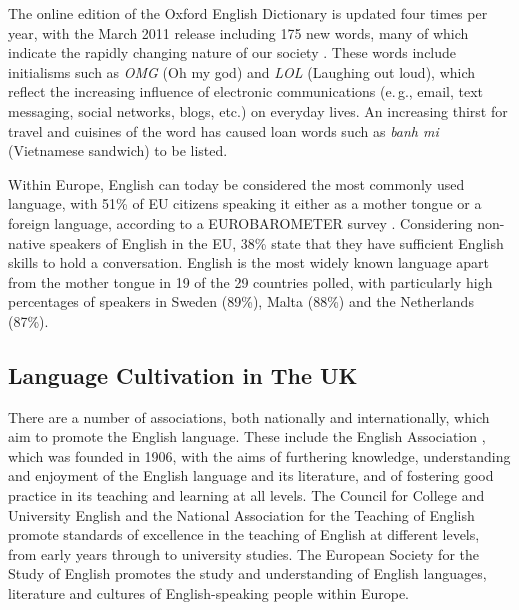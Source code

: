 \begin{multicols}{2}
     
The online edition of the Oxford English Dictionary is updated four times per year, with the March 2011 release including 175 new words, many of which indicate the rapidly changing nature of our society \cite{oed}. These words include initialisms such as \textit{OMG} (Oh my god) and \textit{LOL} (Laughing out loud), which reflect the increasing influence of electronic communications (e.\,g., email, text messaging, social networks, blogs, etc.) on everyday lives. An increasing thirst for travel and cuisines of the word has caused loan words such as \textit{banh mi} (Vietnamese sandwich) to be listed. 
    
             
Within Europe, English can today be considered the most commonly used language, with 51\% of EU citizens speaking it either as a mother tongue or a foreign language, according to a EUROBAROMETER survey \cite{europa}. Considering non-native speakers of English in the EU, 38\% state that they have sufficient English skills to hold a conversation. English is the most widely known language apart from the mother tongue in 19 of the 29 countries polled, with particularly high percentages of speakers in Sweden (89\%), Malta (88\%) and the Netherlands (87\%).
    

\subsection{Language Cultivation in The UK}

There are a number of associations, both nationally and internationally, which aim to promote the English language. These include the English Association \cite{EngAssoc}, which was founded in 1906, with the aims of furthering knowledge, understanding and enjoyment of the English language and its literature, and of fostering good practice in its teaching and learning at all levels. The Council for College and University English \cite{ccue} and the National Association for the Teaching of English \cite{nate} promote standards of excellence in the teaching of English at different levels, from early years through to university studies. The European Society for the Study of English \cite{essen} promotes the study and understanding of English languages, literature and cultures of English-speaking people within Europe.


\end{multicols}
